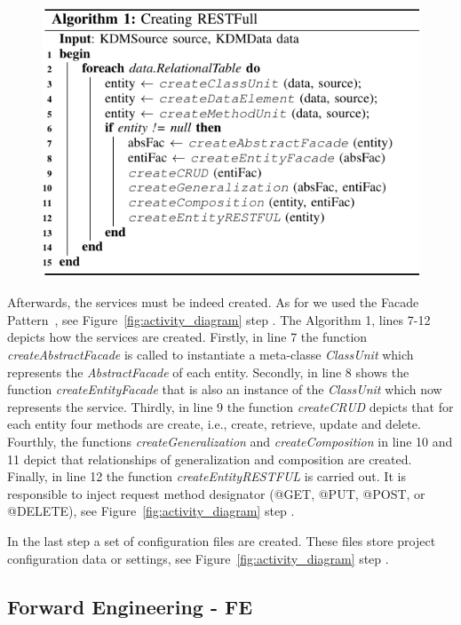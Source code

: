 \documentclass[a4paper,twoside]{article}
\newcommand*\circled[1]{\tikz[baseline=(char.base)]{
  \node[shape=circle,draw, inner sep=0.1pt] (char) {#1};}
}
\begin{document}
\begin{figure}
\centering
  \includegraphics[scale=0.78]{figuras/alg}
\end{figure}

Afterwards, the services must be indeed created. As for we used the Facade Pattern~\cite{Gamma1994}, see Figure~\ref{fig:activity_diagram} step \circled{\textbf{H}}. The Algorithm 1, lines 7-12 depicts how the services are created. Firstly, in line 7 the function \textit{createAbstractFacade} is called to instantiate a meta-classe \textit{ClassUnit} which represents the \textit{AbstractFacade} of each entity. Secondly, in line 8 shows the function \textit{createEntityFacade} that is also an instance of the \textit{ClassUnit} which now represents the service. Thirdly, in line 9 the function \textit{createCRUD} depicts that for each entity four methods are create, i.e., create, retrieve, update and delete. Fourthly, the functions \textit{createGeneralization} and \textit{createComposition} in line 10 and 11 depict that relationships of generalization and composition are created. Finally, in line 12 the function \textit{createEntityRESTFUL} is carried out. It is responsible to inject request method designator (@GET, @PUT, @POST, or @DELETE), see Figure~\ref{fig:activity_diagram} step \circled{\textbf{I}}.

In the last step a set of configuration files are created. These files store project configuration data or settings, see Figure~\ref{fig:activity_diagram} step \circled{\textbf{J}}.

\subsection{Forward Engineering - FE} %
\label{sub:forward_engineering}
\end{document}
